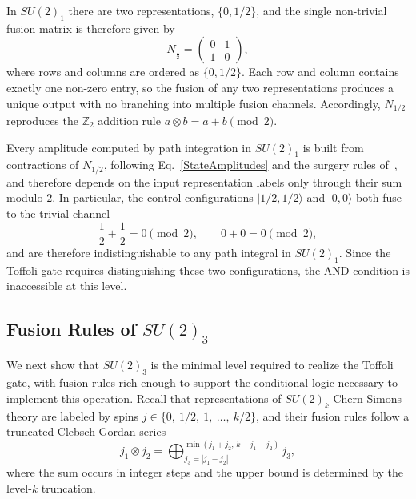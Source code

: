 \documentclass[12pt,a4paper]{article}
\def\ket#1{{|{#1}\rangle}}
\begin{document}
In $SU(2)_1$ there are two representations, $\{0, 1/2\}$, and the single non-trivial fusion matrix is therefore given by
%
\begin{equation}\label{N12_SU21}
N_{\frac{1}{2}} = \begin{pmatrix} 
0 & 1 \\ 
1 & 0 
\end{pmatrix},
\end{equation}
%
where rows and columns are ordered as $\{0, 1/2\}$. Each row and column contains exactly one non-zero entry, so the fusion of any two representations produces a unique output with no branching into multiple fusion channels. Accordingly, $N_{1/2}$ reproduces the $\mathbb{Z}_2$ addition rule $a \otimes b = a + b \pmod{2}$.

Every amplitude computed by path integration in $SU(2)_1$ is built from contractions of $N_{1/2}$, following Eq.\ \eqref{StateAmplitudes} and the surgery rules of~\cite{Salton:2016qpp}, and therefore depends on the input representation labels only through their sum modulo $2$. In particular, the control configurations $\ket{1/2, 1/2}$ and $\ket{0, 0}$ both fuse to the trivial channel
%
\begin{equation}\label{LevelOneRule}
\frac{1}{2} + \frac{1}{2} = 0 \pmod{2}, \qquad 0 + 0 = 0 \pmod{2},
\end{equation}
%
and are therefore indistinguishable to any path integral in $SU(2)_1$. Since the Toffoli gate requires distinguishing these two configurations, the AND condition is inaccessible at this level.

\subsection{Fusion Rules of $SU(2)_3$}\label{subsec:su23_fusion}

We next show that $SU(2)_3$ is the minimal level required to realize the Toffoli gate, with fusion rules rich enough to support the conditional logic necessary to implement this operation. Recall that representations of $SU(2)_k$ Chern-Simons theory are labeled by spins $j \in \{0,\ 1/2,\ 1,\ \ldots,\ k/2\}$, and their fusion rules follow a truncated Clebsch-Gordan series~\cite{Witten1989,MooreSeiberg1989}
%
\begin{equation}\label{TruncatedCG}
j_1 \otimes j_2 = \bigoplus_{j_3 = |j_1-j_2|}^{\min(j_1+j_2,\, k-j_1-j_2)} j_3,
\end{equation}
%
where the sum occurs in integer steps and the upper bound is determined by the level-$k$ truncation. 
\end{document}
